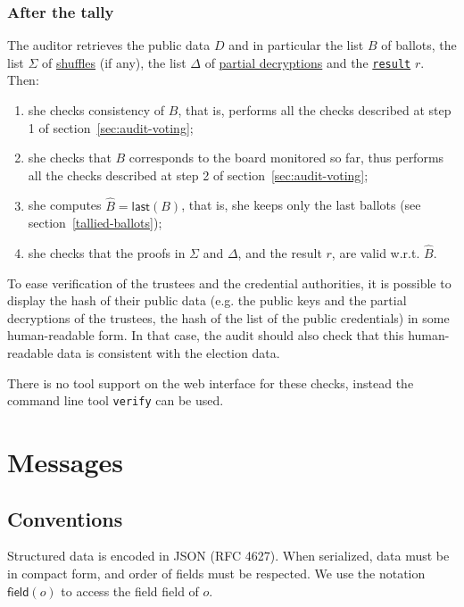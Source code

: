 \documentclass[a4paper]{article}
\newcommand{\result}{\texttt{result}}
\begin{document}
\subsubsection{After the tally}
The auditor retrieves the public data $D$ and in particular the list
$B$ of ballots, the list $\Sigma$ of \hyperref[shuffles]{shuffles} (if
any), the list $\Delta$ of \hyperref[partial-decryptions]{partial
  decryptions} and the \hyperref[election-result]{\result} $r$. Then:

  \begin{enumerate}
   \item she checks consistency of $B$, that is, performs all
    the checks described at step 1 of section~\ref{sec:audit-voting};
  \item she checks that $B$ corresponds to the board
      monitored so far, thus performs all
    the checks described at step 2 of section~\ref{sec:audit-voting};
    \item she computes $\hat{B}=\textsf{last}(B)$, that is, she keeps
      only the last ballots (see section~\ref{tallied-ballots});
 \item she checks that the proofs in $\Sigma$ and $\Delta$, and the result $r$, are valid
    w.r.t. $\hat{B}$.
\end{enumerate}
To ease verification of the trustees and the credential authorities,
it is possible to display the hash of their public data (e.g. the
public keys and the partial decryptions of the trustees, the hash of
the list of the public credentials) in some human-readable form. In
that case, the audit should also check that this human-readable data is
consistent with the election data.

There is no tool support on the web interface for these checks,
instead the command line tool \texttt{verify} can be used.

\section{Messages}
\label{messages}

\subsection{Conventions}

Structured data is encoded in JSON (RFC 4627). When serialized, data
must be in compact form, and order of fields must be respected. We use
the notation $\textsf{field}(o)$ to access the field \textsf{field} of
$o$.
\end{document}
